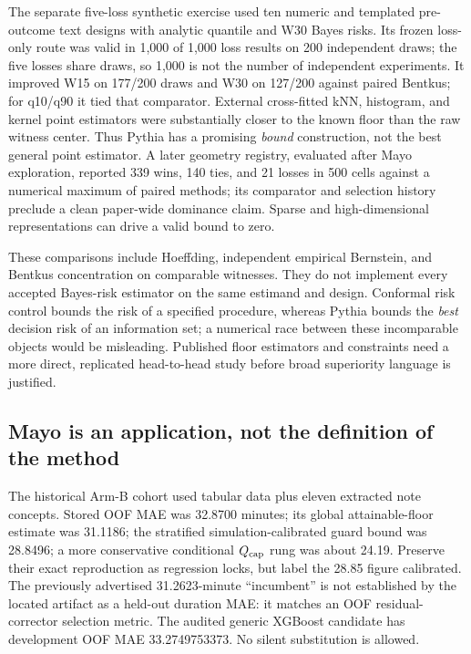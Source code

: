 \documentclass[11pt]{article}
\newcommand{\tier}[1]{\textsf{#1}}
\begin{document}
The separate five-loss synthetic exercise used ten numeric and templated pre-outcome text designs with analytic quantile and W30 Bayes risks. Its frozen loss-only route was valid in 1,000 of 1,000 loss results on 200 independent draws; the five losses share draws, so 1,000 is not the number of independent experiments. It improved W15 on 177/200 draws and W30 on 127/200 against paired Bentkus; for q10/q90 it tied that comparator. External cross-fitted kNN, histogram, and kernel point estimators were substantially closer to the known floor than the raw witness center. Thus Pythia has a promising \emph{bound} construction, not the best general point estimator. A later geometry registry, evaluated after Mayo exploration, reported 339 wins, 140 ties, and 21 losses in 500 cells against a numerical maximum of paired methods; its comparator and selection history preclude a clean paper-wide dominance claim. Sparse and high-dimensional representations can drive a valid bound to zero.

These comparisons include Hoeffding, independent empirical Bernstein, and Bentkus concentration on comparable witnesses. They do not implement every accepted Bayes-risk estimator on the same estimand and design. Conformal risk control bounds the risk of a specified procedure, whereas Pythia bounds the \emph{best} decision risk of an information set; a numerical race between these incomparable objects would be misleading. Published floor estimators and constraints need a more direct, replicated head-to-head study before broad superiority language is justified.

\subsection{Mayo is an application, not the definition of the method}
The historical Arm-B cohort used tabular data plus eleven extracted note concepts. Stored OOF MAE was 32.8700 minutes; its global attainable-floor estimate was 31.1186; the stratified simulation-calibrated guard bound was 28.8496; a more conservative conditional $Q_{\rm cap}$ rung was about 24.19. Preserve their exact reproduction as regression locks, but label the 28.85 figure \tier{calibrated}. The previously advertised 31.2623-minute ``incumbent'' is not established by the located artifact as a held-out duration MAE: it matches an OOF residual-corrector selection metric. The audited generic XGBoost candidate has development OOF MAE 33.2749753373. No silent substitution is allowed.
\end{document}

